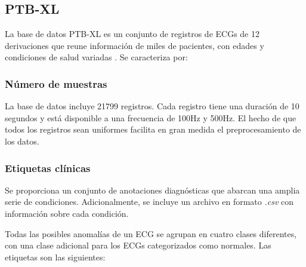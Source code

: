 \subsection{PTB-XL}
La base de datos PTB-XL es un conjunto de registros de ECGs de 12 derivaciones que reune información de miles de pacientes, con edades y condiciones de salud variadas \citep{ptbxlart}. Se caracteriza por:

	\subsubsection{Número de muestras}
	 La base de datos incluye 21799 registros. Cada registro tiene una duración de 10 segundos y está disponible a una frecuencia de 100Hz y 500Hz. El hecho de que todos los registros sean uniformes facilita en gran medida el preprocesamiento de los datos.
	
	\subsubsection{Etiquetas clínicas}
	\label{subsec:anomalias}
	 Se proporciona un conjunto de anotaciones diagnósticas que abarcan una amplia serie de condiciones. Adicionalmente, se incluye un archivo en formato \emph{.csv} con información sobre cada condición.
	 
	 Todas las posibles anomalías de un ECG se agrupan en cuatro clases diferentes, con una clase adicional para los ECGs categorizados como normales. Las etiquetas son las siguientes:
	 
